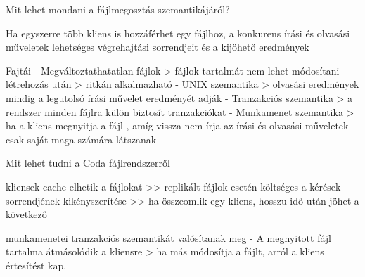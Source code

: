 \documentclass[twoside, a4paper, 12pt]{article}
\begin{document}
\begin{description}
                                                                    \item  Mit lehet mondani a fájlmegosztás szemantikájáról?  
                                                                    \item Ha egyszerre több kliens is hozzáférhet egy fájlhoz, a konkurens írási és olvasási műveletek lehetséges végrehajtási sorrendjeit és a kijöhető eredmények
                                                                    \item Fajtái
                                                                        - Megváltoztathatatlan fájlok
                                                                        > fájlok tartalmát nem lehet módosítani létrehozás után
                                                                        > ritkán alkalmazható
                                                                        - UNIX szemantika
                                                                        > olvasási eredmények mindig a legutolsó írási művelet eredményét adják
                                                                        - Tranzakciós szemantika
                                                                        > a rendszer minden fájlra külön biztosít tranzakciókat
                                                                        - Munkamenet szemantika
                                                                        > ha a kliens megnyitja a fájl , amíg vissza nem írja az írási és olvasási műveletek csak saját maga számára látszanak
                                                                    \item  Mit lehet tudni a Coda fájlrendszerről 
                                                                    \item kliensek cache-elhetik a fájlokat
                                                                        >> replikált fájlok esetén költséges a kérések sorrendjének kikényszerítése
                                                                        >> ha összeomlik egy kliens, hosszu idő után jöhet a következő
                                                                    \item munkamenetei tranzakciós szemantikát valósítanak meg
                                                                        - A megnyitott fájl tartalma átmásolódik a kliensre
                                                                        > ha más módosítja a fájlt, arról a kliens értesítést kap.

\end{description}
\end{document}
